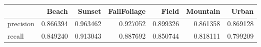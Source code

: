 \begin{tabular}{lrrrrrr}
\toprule
 & Beach & Sunset & FallFoliage & Field & Mountain & Urban \\
\midrule
precision & 0.866394 & 0.963462 & 0.927052 & 0.899326 & 0.861358 & 0.869128 \\
recall & 0.849240 & 0.913043 & 0.887692 & 0.850744 & 0.818111 & 0.799209 \\
\bottomrule
\end{tabular}
